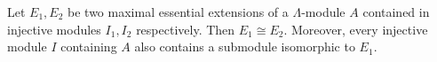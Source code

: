 Let $E_1, E_2$ be two maximal essential extensions of a $\Lambda$-module $A$ contained in injective modules $I_1, I_2$ respectively. Then $E_1 \cong E_2$. Moreover, every injective module $I$ containing $A$ also contains a submodule isomorphic to $E_1$.

